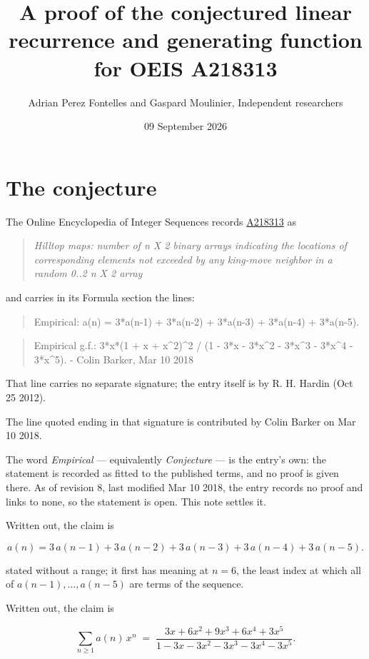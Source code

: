 \documentclass[11pt]{article}
\title{A proof of the conjectured linear recurrence and generating function for OEIS A218313}
\author{Adrian Perez Fontelles and Gaspard Moulinier, Independent researchers}
\date{09 September 2026}
\theoremstyle{definition}
\begin{document}
\maketitle
\section{The conjecture}

The Online Encyclopedia of Integer Sequences records \href{https://oeis.org/A218313}{A218313} as

\begin{quote}\itshape Hilltop maps: number of n X 2 binary arrays indicating the locations of corresponding elements not exceeded by any king-move neighbor in a random 0..2 n X 2 array\end{quote}

and carries in its Formula section the lines:

\begin{quote}\ttfamily Empirical: a(n) = 3*a(n-1) + 3*a(n-2) + 3*a(n-3) + 3*a(n-4) + 3*a(n-5).\end{quote}

\begin{quote}\ttfamily Empirical g.f.: 3*x*(1 + x + x\textasciicircum{}2)\textasciicircum{}2 / (1 - 3*x - 3*x\textasciicircum{}2 - 3*x\textasciicircum{}3 - 3*x\textasciicircum{}4 - 3*x\textasciicircum{}5). - Colin Barker, Mar 10 2018\end{quote}

That line carries no separate signature; the entry itself is by R. H. Hardin (Oct 25 2012).

The line quoted ending in that signature is contributed by Colin Barker on Mar 10 2018.

The word {\itshape Empirical} --- equivalently {\itshape Conjecture} --- is the entry's own: the statement is recorded as fitted to the published terms, and no proof is given there. As of revision 8, last modified Mar 10 2018, the entry records no proof and links to none, so the statement is open. This note settles it.

Written out, the claim is

\[a(n) = 3\,a(n-1) + 3\,a(n-2) + 3\,a(n-3) + 3\,a(n-4) + 3\,a(n-5).\]

stated without a range; it first has meaning at $n = 6$, the least index at which all of $a(n-1),\dots,a(n-5)$ are terms of the sequence.

Written out, the claim is

\[\sum_{n \ge 1} a(n)\,x^n \;=\; \frac{3x + 6x^{2} + 9x^{3} + 6x^{4} + 3x^{5}}{1 - 3x - 3x^{2} - 3x^{3} - 3x^{4} - 3x^{5}}.\]
\end{document}
